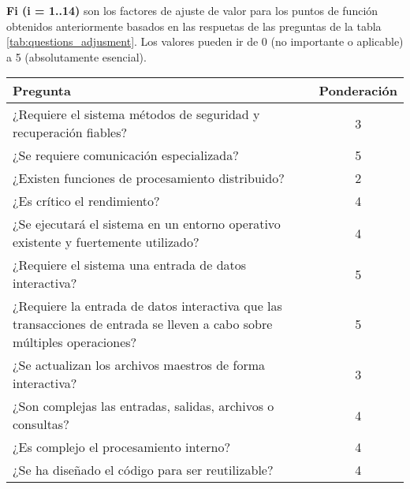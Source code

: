 	\textbf{Fi (i = 1..14)} son los factores de ajuste de valor para los puntos de función obtenidos anteriormente basados en las respuetas de las preguntas de la tabla \ref{tab:questions_adjusment}. Los valores pueden ir de 0 (no importante o aplicable) a 5 (absolutamente esencial).

	\begin{table}[H]
		\begin{tabular}{|p{9cm}|c|}
		\hline
		Pregunta                                                                                                                 & Ponderación \\ \hline
		¿Requiere el sistema métodos de seguridad y recuperación fiables?                                                        & 3           \\ \hline
		¿Se requiere comunicación especializada?                                                                             		 & 5           \\ \hline
		¿Existen funciones de procesamiento distribuido?                                                                         & 2           \\ \hline
		¿Es crítico el rendimiento?                                                                                              & 4           \\ \hline
		¿Se ejecutará el sistema en un entorno operativo existente y fuertemente utilizado?                                      & 4           \\ \hline
		¿Requiere el sistema una entrada de datos interactiva?                                                                   & 5           \\ \hline
		¿Requiere la entrada de datos interactiva que las transacciones de entrada se lleven a cabo sobre múltiples operaciones? & 5           \\ \hline
		¿Se actualizan los archivos maestros de forma interactiva?                                                               & 3           \\ \hline
		¿Son complejas las entradas, salidas, archivos o consultas?                                                              & 4           \\ \hline
		¿Es complejo el procesamiento interno?                                                                                   & 4           \\ \hline
		¿Se ha diseñado el código para ser reutilizable?                                                                         & 4           \\ \hline

\end{tabular}
\end{table}
